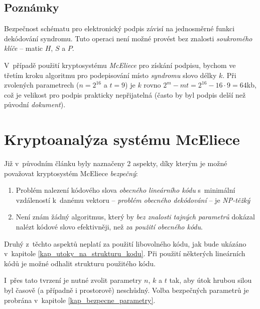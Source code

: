 \documentclass[thesis=M,czech,hidelinks]{FITthesis}[2012/06/26]
\newcommand{\0}{{\textcolor[gray]{0.80}{0}}}
\begin{document}
\subsection{Poznámky}
Bezpečnost schématu pro elektronický podpis závisí na jednosměrné funkci
dekódování syndromu. Tuto operaci není možné provést bez znalosti
\emph{soukromého klíče} -- matic $H$, $S$ a $P$.

V~případě použití kryptosystému \emph{McEliece} pro získání podpisu, bychom ve
třetím kroku algoritmu pro podepisování místo \emph{syndromu} slovo délky $k$.
Při zvolených parametrech ($n=2^{16}$ a $t=9$) je $k$ rovno $2^m - m t = 2^{16}
- 16 \cdot 9 = 64$\;kb, což je velikost pro podpis prakticky nepřijatelná
(často by byl podpis delší než původní \emph{dokument}).

\clearpage


\section{Kryptoanalýza systému McEliece}
Již v~původním článku \cite{McEliece} byly naznačeny 2 aspekty, díky kterým je
možné považovat kryptosystém McEliece \emph{bezpečný}:


\begin{enumerate}
    \item Problém nalezení kódového slova \emph{obecného lineárního kódu}
        s~minimální vzdáleností k~danému vektoru
        -- \emph{problém obecného dekódování} -- je \emph{NP-těžký}
        \cite{Berlekamp}
    \item Není znám žádný algoritmus, který by \emph{bez znalosti tajných parametrů}
        dokázal nalézt kódové slovo efektivněji, než \emph{za použití obecného kódu}.
\end{enumerate}


Druhý z~těchto aspektů neplatí za použití libovolného kódu, jak bude ukázáno
v~kapitole \ref{kap_utoky_na_strukturu_kodu}. Při použití některých lineárních
kódů je možné odhalit strukturu použitého kódu.

I~přes tato tvrzení je nutné zvolit parametry $n$, $k$ a $t$ tak, aby útok
hrubou silou byl časově (a případně i prostorově) neschůdný. Volba bezpečných
parametrů je probrána v~kapitole \ref{kap_bezpecne_parametry}.


\end{document}
